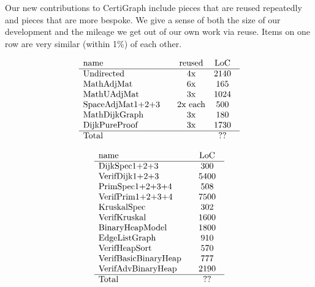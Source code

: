 Our new contributions to CertiGraph include pieces that are reused 
repeatedly and pieces that are more bespoke. We give a sense of both the 
size of our development and the mileage we get out of our own work via reuse. 
Items on one row are very similar (within 1\%) of each other.

\[
\begin{array}{l@{\qquad}c@{\quad}c@{\quad}c@{\quad}l}
\text{name} & \text{reused} & \text{LoC} \\
\hline
\text{Undirected} & \text{4x} & \text{2140} \\
\text{MathAdjMat} & \text{6x} & \text{165} \\
\text{MathUAdjMat} & \text{3x} & \text{1024} \\
\text{SpaceAdjMat1+2+3} & \text{2x each} & \text{500} \\
\text{MathDijkGraph} & \text{3x} & \text{180} \\
\text{DijkPureProof} & \text{3x} & \text{1730} \\
\hline
\text{Total} & & \text{??} \\
\end{array}
\]

\[
\begin{array}{l@{\qquad}c@{\quad}c@{\quad}c@{\quad}l}
\text{name} &  \text{LoC} \\
\hline
\text{DijkSpec1+2+3} & \text{300} \\
\text{VerifDijk1+2+3} & \text{5400} \\
\text{PrimSpec1+2+3+4} & \text{508} \\
\text{VerifPrim1+2+3+4} & \text{7500} \\
\text{KruskalSpec} & \text{302} \\
\text{VerifKruskal} & \text{1600} \\
\text{BinaryHeapModel} & \text{1800} \\
\text{EdgeListGraph} & \text{910} \\
\text{VerifHeapSort} & \text{570} \\
\text{VerifBasicBinaryHeap} & \text{777} \\
\text{VerifAdvBinaryHeap} & \text{2190} \\
\hline
\text{Total} & \text{??} \\
\end{array}
\]